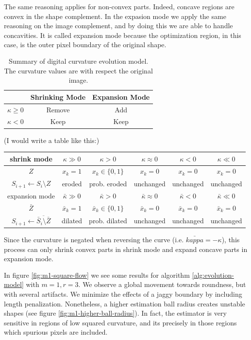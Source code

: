 \documentclass[runningheads]{llncs}
\begin{document}
The same reasoning applies for non-convex parts. Indeed, concave regions are convex in the shape complement. In the expasion mode we apply the same reasoning on the image complement, and by doing this we are able to handle concavities. It is called expansion mode because the optimization region, in this case, is the outer pixel boundary of the original shape. 

\begin{table}
	\center
	\begin{tabular}{c|c|c}
		& Shrinking Mode & Expansion Mode\\
		\hline
		$\kappa \geq 0$ & Remove & Add\\
		$\kappa < 0$ & Keep	& Keep
	\end{tabular}
	\caption{Summary of digital curvature evolution model. The curvature values are with respect the original image.}		
	\label{tab:flow-summary}	
\end{table}



\begin{table}
  \color{green!50!black}
  (I would write a table like this:)
  \center
  \begin{tabular}{|c|c|c|c|c|c|} \hline
    shrink mode &    $\kappa \gg 0$ & $\kappa > 0$ & $\kappa \approx 0$ & $\kappa < 0$ & $\kappa \ll 0$ \\ \hline
    $Z$ & $x_k=1$ & $x_k \in \{0,1\}$ & $x_k=0$ & $x_k=0$ & $x_k=0$ \\ \hline
    $S_{i+1} \leftarrow S_i \setminus Z$ & eroded & prob. eroded & unchanged & unchanged & unchanged \\ \hline \hline
    expansion mode &    $\bar{\kappa} \gg 0$ & $\bar{\kappa} > 0$ & $\bar{\kappa} \approx 0$ & $\bar{\kappa} < 0$ & $\bar{\kappa} \ll 0$ \\ \hline
    $\bar{Z}$ & $\bar{x}_k=1$ & $\bar{x}_k \in \{0,1\}$ & $\bar{x}_k=0$ & $\bar{x}_k=0$ & $\bar{x}_k=0$ \\ \hline
    $S_{i+1} \leftarrow \overline{\bar{S}_i \setminus \bar{Z}}$ & dilated & prob. dilated & unchanged & unchanged & unchanged \\ \hline 
  \end{tabular}
  
  Since the curvature is negated when reversing the curve (i.e. $\bar{kappa}=-\kappa$), this process can only shrink  convex parts in shrink mode and expand concave parts in expansion mode.
\end{table}


In figure \ref{fig:m1-square-flow} we see some results for algorithm \ref{alg:evolution-model} with $m=1,r=3$. We observe a global movement towards roundness, but with several artifacts. We minimize the effects of a jaggy boundary by including length penalization. Nonetheless, a higher estimation ball radius creates unstable shapes (see figure \ref{fig:m1-higher-ball-radius}). In fact, the estimator is very sensitive in regions of low squared curvature, and its precisely in those regions which spurious pixels are included.
\end{document}
